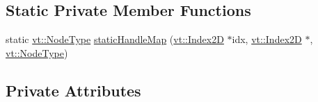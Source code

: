 \subsection*{Static Private Member Functions}
\begin{DoxyCompactItemize}
\item 
static \hyperlink{namespacevt_a866da9d0efc19c0a1ce79e9e492f47e2}{vt\+::\+Node\+Type} \hyperlink{structvt_1_1rdma_1_1_manager_a4a4972102f481ce6190cf8cf01a83cb8}{static\+Handle\+Map} (\hyperlink{namespacevt_a3bab786053b74a3d856fff1412ffa73a}{vt\+::\+Index2D} $\ast$idx, \hyperlink{namespacevt_a3bab786053b74a3d856fff1412ffa73a}{vt\+::\+Index2D} $\ast$, \hyperlink{namespacevt_a866da9d0efc19c0a1ce79e9e492f47e2}{vt\+::\+Node\+Type})
\end{DoxyCompactItemize}
\subsection*{Private Attributes}
